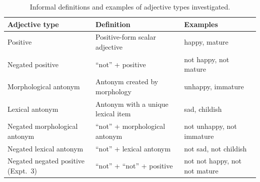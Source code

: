 \documentclass[floatsintext,doc]{apa6}
\newcommand{\ourmodel}{Flexible Negation\xspace}
\begin{document}





%
%

\begin{table}[b]
\centering
\begingroup\fontsize{10pt}{11pt}\selectfont
\begin{tabularx}{\textwidth}{lll}
  \hline
 Adjective type & Definition & Examples \\ 
  \hline
 Positive & Positive-form scalar adjective & happy, mature \\ 
  Negated positive &  ``not'' + positive & not happy, not mature \\ 
  Morphological antonym &  Antonym created by morphology & unhappy, immature \\ 
  Lexical antonym & Antonym with a unique lexical item & sad, childish \\ 
  Negated morphological antonym &  ``not'' + morphological antonym & not unhappy, not immature \\ 
  Negated lexical antonym   &  ``not'' +  lexical antonym & not sad, not childish \\ 
  Negated negated positive (Expt.~3)  &  ``not'' + ``not'' + positive & not not happy, not not mature \\ 
   \hline
\end{tabularx}
\endgroup
\caption{Informal definitions and examples of adjective types investigated.} 
\end{table}
\end{document}
